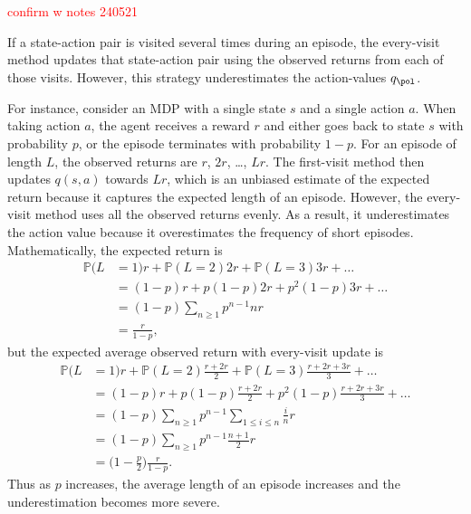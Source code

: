 \begin{remark}

\textcolor{red}{confirm w notes 240521}

If a state-action pair is visited several times during an episode, 
the every-visit method updates that state-action pair using the observed returns 
from each of those visits.
However, this strategy underestimates the action-values $q_\pol$.

For instance, consider an MDP with a single state $s$ and a single action $a$. When taking action $a$, the agent receives a reward $r$ and either goes back to state $s$ with probability $p$, or the episode terminates with probability $1-p$. For an episode of length $L$, the observed returns are $r$, $2r$, \ldots, $Lr$. The first-visit method then updates $q(s,a)$ towards $Lr$, which is an unbiased estimate of the expected return because it captures the expected length of an episode.
However, the every-visit method uses all the observed returns evenly. As a result, it underestimates the action value because it overestimates the frequency of short episodes.
Mathematically, the expected return is
\begin{align*}
    \mathbb{P}(L&=1) r + \mathbb{P}(L=2) 2 r + \mathbb{P}(L=3) 3 r + \dots 
    \\
    &= (1-p)r + p(1-p)2r + p^2 (1-p) 3r + \dots
    \\
    &= (1-p) \sum_{n \geq 1} p^{n-1} n r
    \\
    &= \frac{r}{1-p} ,
\end{align*}
but the expected average observed return with every-visit update is 
\begin{align*}
    \mathbb{P}(L&=1) r + \mathbb{P}(L=2) \frac{r+2r}{2} + \mathbb{P}(L=3) \frac{r+2r+3r}{3} + \dots 
    \\
    &= (1-p)r + p(1-p)\frac{r + 2r}{2} + p^2 (1-p) \frac{r+2r+3r}{3} + \dots
    \\
    &= (1-p) \sum_{n \geq 1} p^{n-1} \sum_{1\leq i\leq n} \frac{i}{n} r
    \\
    &= (1-p) \sum_{n \geq 1} p^{n-1} \frac{n+1}{2} r
    \\
    &= \Big(1-\frac{p}{2}\Big) \frac{r}{1-p} .
\end{align*}
Thus as $p$ increases, the average length of an episode increases and the underestimation becomes more severe.
\end{remark}